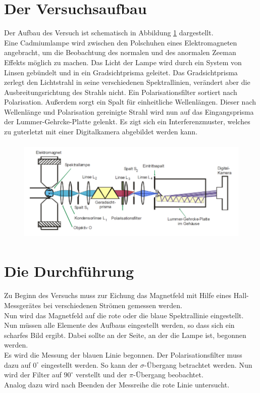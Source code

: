 \section{Der Versuchsaufbau}
Der Aufbau des Versuch ist schematisch in Abbildung \ref{Fig:Aufbau} dargestellt.\\
Eine Cadmiumlampe wird zwischen den Polschuhen eines Elektromagneten angebracht, um die Beobachtung des normalen und des anormalen Zeeman Effekts möglich zu machen. Das Licht der Lampe wird durch ein System von Linsen gebündelt und in ein Gradsichtprisma geleitet. Das Gradsichtprisma zerlegt den Lichtstrahl in seine verschiedenen Spektrallinien, verändert aber die Ausbreitungsrichtung des Strahls nicht. Ein Polarisationsfilter sortiert nach Polarisation. Außerdem sorgt ein Spalt für einheitliche Wellenlängen. Dieser nach Wellenlänge und Polarisation gereinigte Strahl wird nun auf das Eingangsprisma der Lummer-Gehrcke-Platte gelenkt. Es zigt sich ein Interferenzmuster, welches zu guterletzt mit einer Digitalkamera abgebildet werden kann.
\begin{figure}[H]
    \centering
    \captionsetup{justification=centering}
    \includegraphics[height=5cm]{"Aufbau.png"}
    \label{Fig:Aufbau}
\end{figure}
\section{Die Durchführung}
Zu Beginn des Versuchs muss zur Eichung das Magnetfeld mit Hilfe eines Hall-Messgerätes bei verschiedenen Strömen gemessen werden.\\
Nun wird das Magnetfeld auf die rote oder die blaue Spektrallinie eingestellt. Nun müssen alle Elemente des Aufbaus eingestellt werden, so dass sich ein scharfes Bild ergibt. Dabei sollte an der Seite, an der die Lampe ist, begonnen werden.\\ 
Es wird die Messung der blauen Linie begonnen. Der Polarisationsfilter muss dazu auf $0^\circ$ eingestellt werden. So kann der $\sigma$-Übergang betrachtet werden. Nun wird der Filter auf $90^\circ$ verstellt und der $\pi$-Übergang beobachtet.\\
Analog dazu wird nach Beenden der Messreihe die rote Linie untersucht.